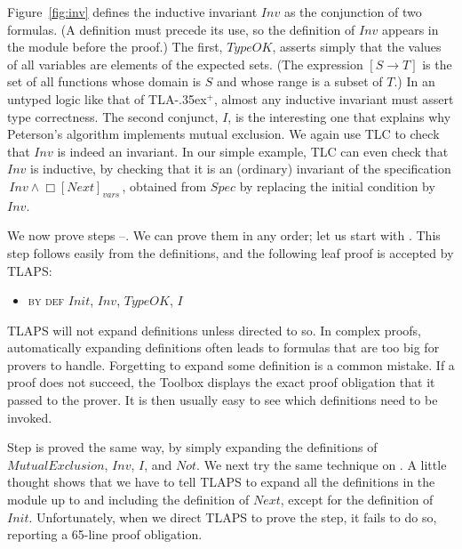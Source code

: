 \documentclass[a4paper,draft]{llncs}
\makeatletter
\newcommand{\tlaplus}{\mbox{TLA\kern -.35ex$^+$}\xspace}
\newcommand{\step}[2]{{\tlatex \@pfstepnum{#1}{#2}}}
\newenvironment{display}{\begin{itemize}\item[]}{\end{itemize}}
\makeatother
\begin{document}
Figure~\ref{fig:inv} defines the inductive invariant $Inv$ as the conjunction of
two formulas.
(A definition must precede its use, so the definition of $Inv$ appears
in the module before the proof.) 
The first, $TypeOK$, asserts simply that the
values of all variables are elements of the expected sets.  (The
expression $[S\rightarrow T]$ is the set of all functions whose domain is
$S$ and whose range is a subset of $T$.)  In an untyped logic like that of
\tlaplus, almost any inductive invariant must assert type correctness.
The second conjunct, $I$, is the interesting one that explains why
Peterson's algorithm implements mutual exclusion. We again use TLC to check that
$Inv$ is indeed an invariant. In our simple example, TLC can even check that
$Inv$ is inductive, by checking that it is an (ordinary) invariant of the
specification
 \,\mbox{$Inv \land \Box[Next]_{vars}$}\,,
obtained from $Spec$ by replacing the initial condition by $Inv$.

We now prove steps \step{1}{1}--\step{1}{3}. We can prove them in any order; let
us start with \step{1}{1}. This step follows easily from the definitions, and
the following leaf proof is accepted by TLAPS:
\begin{display}
\textsc{by def} $Init$, $Inv$, $TypeOK$, $I$
\end{display}
%
TLAPS will not expand definitions unless directed to so.
In complex proofs, automatically expanding definitions often leads to
formulas that are too big for provers to handle. 
Forgetting to expand some definition is a common mistake.
If a proof does not succeed, the
Toolbox 
displays the exact proof obligation that it passed
to the prover. It is then usually easy to see which definitions need to be invoked.


Step \step{1}{3} is proved the same way, by simply expanding the definitions of
$MutualExclusion$, $Inv$, $I$, and $Not$. We next try the same
technique on \step{1}{2}. A little thought shows that we have to tell TLAPS to
expand all the definitions in the module up to and including the definition of
$Next$, except for the definition of $Init$. Unfortunately, when we direct TLAPS
to prove the step, it fails to do so, reporting a 65-line proof obligation.
\end{document}
